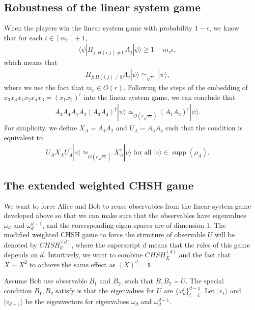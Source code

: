 \documentclass[11pt,letterpaper]{article}
\newcommand{\ket}[1]{|#1\rangle}
\newcommand{\bra}[1]{\langle#1|}
\DeclareMathOperator{\supp}{supp}
\newcommand{\1}{\mathbb{1}}
\newcommand{\CHSH}{CHSH^{(d)}}
\newcommand{\appd}[1]{\simeq_{#1}}
\theoremstyle{definition}
\begin{document}
\subsection{Robustness of the linear system game}
When the players win the linear system game with probability $1-\epsilon$,
we know that for each $i \in [m_r]+1$,
\begin{align}
\bra{\psi} \Pi_{j:H(i,j) \neq 0} A_j \ket{\psi} \geq 1- m_r \epsilon,
\end{align}
which means that 
\begin{align}
	\Pi_{j:H(i,j) \neq 0} A_j \ket{\psi} \appd{\sqrt{r\epsilon}} \ket{\psi},
\end{align}
where we use the fact that $m_r \in O(r)$.
Following the steps of the embedding of $x_3x_4x_1x_2x_4x_3 = (x_1x_2)^r$ into the linear system game,
we can conclude that 
\begin{align}
	A_3A_4 A_1A_2 (A_3A_4)^\dagger \ket{\psi}\appd{O(r\sqrt{r\epsilon})} (A_1A_2)^r \ket{\psi}.
\end{align}
For simplicity, we define $X_A = A_1A_2$ and $U_A=A_3A_4$ such that
the condition is equivalent to
\begin{align}
	\label{eq:ux_relation}
	U_AX_AU_A^\dagger \ket{v} \appd{O(r\sqrt{r\epsilon})} X_A^r \ket{v} \text{ for all } \ket{v} \in \supp(\rho_A).
\end{align}

\subsection{The extended weighted CHSH game}
We want to force Alice and Bob to reuse observables 
from the linear system game developed above so that we can make sure that the observables have
eigenvalues $\omega_d$ and $\omega_d^{d-1}$, and the corresponding eigen-spaces are 
of dimension $1$. The modified weighted CHSH game to force the structure of observable $U$ will be
denoted by $\CHSH_U$, where the superscript $d$ means that the rules of this game depends on $d$.
Intuitively, we want to combine $\CHSH_X$ and the fact that $X \sim X^2$ to achieve the same effect as 
$(X)^d = \1$.

Assume Bob use observable $B_1$ and $B_2$, such that $B_1B_2 = U$. 
The special condition $B_1, B_2$ satisfy is that the eigenvalues for 
$U$ are $\{\omega_d^i\}_{i=1}^{d-1}$. Let $\ket{v_1}$ and $\ket{v_{d-1}}$ be the 
eigenvectors for eigenvalues $\omega_d$ and $\omega_d^{d-1}$. 
\end{document}
